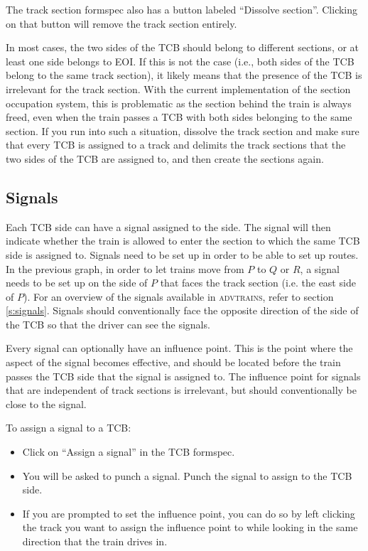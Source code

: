 \documentclass[notitlepage]{article}
\def\advtrains{\textsc{advtrains}}
\begin{document}
The track section formspec also has a button labeled ``Dissolve section''. Clicking on that button will remove the track section entirely.

In most cases, the two sides of the TCB should belong to different sections, or at least one side belongs to EOI. If this is not the case (i.e., both sides of the TCB belong to the same track section), it likely means that the presence of the TCB is irrelevant for the track section. With the current implementation of the section occupation system, this is problematic as the section behind the train is always freed, even when the train passes a TCB with both sides belonging to the same section. If you run into such a situation, dissolve the track section and make sure that every TCB is assigned to a track and delimits the track sections that the two sides of the TCB are assigned to, and then create the sections again.

\subsection{Signals}\label{s:ilsignals}

Each TCB side can have a signal assigned to the side. The signal will then indicate whether the train is allowed to enter the section to which the same TCB side is assigned to. Signals need to be set up in order to be able to set up routes. In the previous graph, in order to let trains move from $P$ to $Q$ or $R$, a signal needs to be set up on the side of $P$ that faces the track section (i.e. the east side of $P$). For an overview of the signals available in \advtrains, refer to section \ref{s:signals}. Signals should conventionally face the opposite direction of the side of the TCB so that the driver can see the signals.

Every signal can optionally have an influence point. This is the point where the aspect of the signal becomes effective, and should be located before the train passes the TCB side that the signal is assigned to. The influence point for signals that are independent of track sections is irrelevant, but should conventionally be close to the signal.

To assign a signal to a TCB:
\begin{itemize}
\item Click on ``Assign a signal'' in the TCB formspec.
\item You will be asked to punch a signal. Punch the signal to assign to the TCB side.
\item If you are prompted to set the influence point, you can do so by left clicking the track you want to assign the influence point to while looking in the same direction that the train drives in.
\end{itemize}
\end{document}
